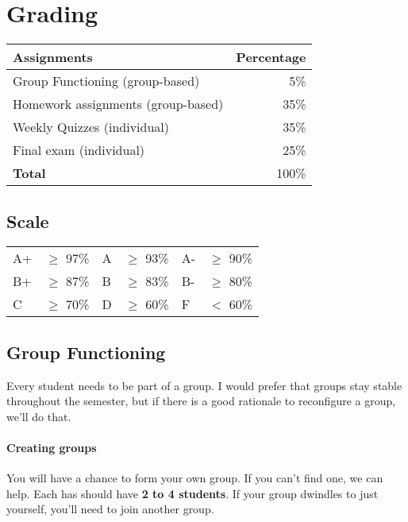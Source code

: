 \documentclass[11pt]{article}
\begin{document}
\section{Grading}\label{sec:grading}

\begin{center}
\begin{tabular}{lr}
\textbf{Assignments} & \textbf{Percentage} \\
\hline
Group Functioning (group-based) & 5\% \\
Homework assignments (group-based) & 35\% \\
Weekly Quizzes (individual) & 35\% \\
  Final exam (individual) & 25\% \\
  \hline
    \textbf{Total} & 100\% \\
\end{tabular}
\end{center}
\subsection{Scale}\label{scale}

\begin{center}
\begin{tabular}{ll|ll|ll}
A+ & $\ge$ 97\% & A & $\ge$  93\% & A- & $\ge$
90\% \\
B+ & $\ge$  87\% & B & $\ge$  83\% & B- & $\ge$
80\% \\
C & $\ge$  70\% & D & $\ge$  60\% & F & $<$
60\% \\
\end{tabular}
\end{center}
\subsection{Group Functioning}\label{group-functioning}

Every student needs to be part of a group. I would prefer that groups
stay stable throughout the semester, but if there is a good rationale to
reconfigure a group, we'll do that.



\paragraph{Creating groups} You will have a chance to form your own group.
If you can't find one, we can help. Each has should have \textbf{2 to 4 students}. If your group dwindles to just yourself, you'll need to join another group.
\end{document}
